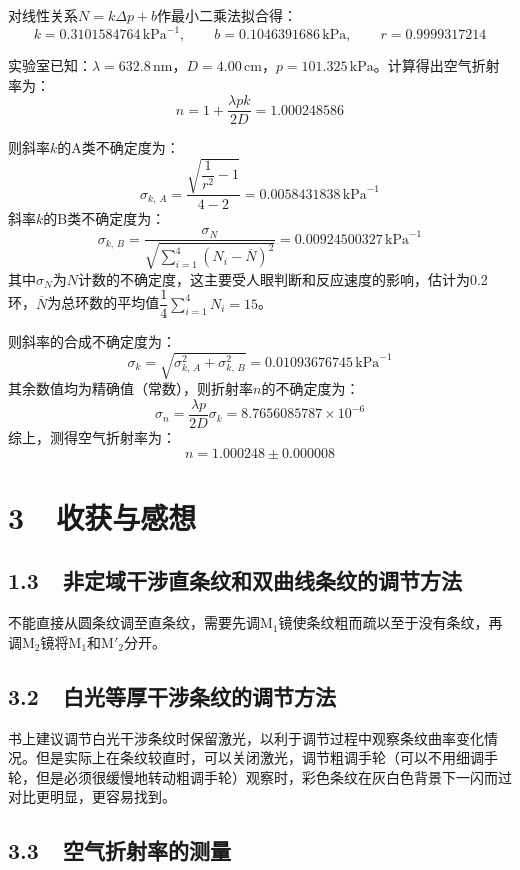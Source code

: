 \documentclass[a4paper,fontset=windows]{ctexart}
\begin{document}
    对线性关系$N = k\Delta p + b$作最小二乘法拟合得：
    \[
    k=0.3101584764\,\mathrm{kPa}^{-1},\qquad b=0.1046391686\,\mathrm{kPa},\qquad r=0.9999317214
    \]

    实验室已知：$\lambda = 632.8\,\mathrm{nm}$，$D = 4.00\,\mathrm{cm}$，$p = 101.325\,\mathrm{kPa}$。计算得出空气折射率为：
    \[
    n = 1 + \frac{\lambda pk}{2D} = 1.000248586
    \]

    则斜率$k$的A类不确定度为：
    \[
    \sigma_{k,\, A} = \frac{\sqrt{\dfrac{1}{r^2}-1}}{4-2} = 0.0058431838\,\mathrm{kPa}^{-1}
    \]
    斜率$k$的B类不确定度为：
    \[
    \sigma_{k,\, B} = \frac{\sigma_{N}}{\sqrt{\sum\limits_{i=1}^{4}(N_i - \overline{N})^2}} = 0.00924500327\,\mathrm{kPa}^{-1}
    \]
    其中$\sigma_{N}$为$N$计数的不确定度，这主要受人眼判断和反应速度的影响，估计为0.2环，$\overline{N}$为总环数的平均值$\dfrac{1}{4}\sum\limits_{i=1}^{4}N_i = 15$。

    则斜率的合成不确定度为：
    \[
    \sigma_k = \sqrt{\sigma_{k,\, A}^2 + \sigma_{k,\, B}^2} = 0.01093676745\,\mathrm{kPa}^{-1}
    \]
    其余数值均为精确值（常数），则折射率$n$的不确定度为：
    \[
    \sigma_n = \frac{\lambda p}{2D}\sigma_k = 8.7656085787\times10^{-6}
    \]
    综上，测得空气折射率为：
    \[
    n = 1.000248 \pm 0.000008
    \]

    \section*{3\ \ 收获与感想}

    \subsection*{1.3\ \ 非定域干涉直条纹和双曲线条纹的调节方法}

    不能直接从圆条纹调至直条纹，需要先调$\mathrm{M}_1$镜使条纹粗而疏以至于没有条纹，再调$\mathrm{M}_2$镜将$\mathrm{M}_1$和$\mathrm{M}'_2$分开。

    \subsection*{3.2\ \ 白光等厚干涉条纹的调节方法}

    书上建议调节白光干涉条纹时保留激光，以利于调节过程中观察条纹曲率变化情况。但是实际上在条纹较直时，可以关闭激光，调节粗调手轮（可以不用细调手轮，但是必须很缓慢地转动粗调手轮）观察时，彩色条纹在灰白色背景下一闪而过对比更明显，更容易找到。

    \subsection*{3.3\ \ 空气折射率的测量}
\end{document}
